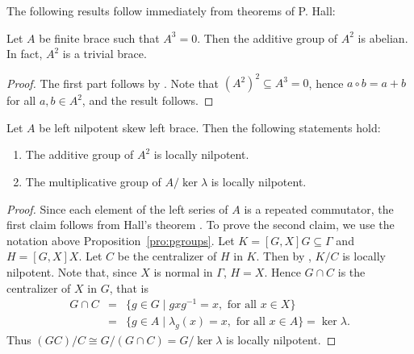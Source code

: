 The following results follow immediately from theorems of P.  Hall:

\begin{lemma}
    Let $A$ be finite brace such that $A^3=0$. Then the additive group of
    $A^2$ is abelian. In fact, $A^2$ is a trivial brace.
\end{lemma}

\begin{proof}
The first part follows by \cite[Theorem~6]{Hall}. Note that
$(A^2)^2\subseteq A^3=0$, hence $a\circ b=a+b$ for all $a,b\in A^2$, and
the result follows.
\end{proof}


\begin{theorem}
    \label{thm:A2}
    Let $A$ be left nilpotent skew left brace. Then the following statements
    hold:
    \begin{enumerate}
        \item The additive group of $A^2$ is locally nilpotent.
        \item The multiplicative group of $A/\ker\lambda$ is locally nilpotent.
    \end{enumerate}
\end{theorem}

\begin{proof}
    Since each element of the left series of $A$ is a repeated commutator, the
    first claim follows from Hall's theorem \cite[Theorem~4]{Hall}.
    To prove the second claim, we use the notation above
    Proposition~\ref{pro:pgroups}. Let $K=[G,X]G\subseteq \Gamma$ and
    $H=[G,X]X$. Let $C$ be the centralizer of $H$ in $K$. Then by
    \cite[Theorem~4]{Hall}, $K/C$ is locally nilpotent. Note
    that, since $X$ is normal in $\Gamma$, $H=X$. Hence $G\cap C$ is the
    centralizer of $X$ in $G$, that is
    \begin{eqnarray*}G\cap C&=&\{ g\in G\mid gxg^{-1}=x, \text{ for all } x\in X\}\\
    &=&\{ g\in A\mid \lambda_g(x)=x, \text{ for all } x\in A\}=\ker\lambda.
    \end{eqnarray*}
     Thus $(GC)/C\cong G/(G\cap
     C)=G/\ker\lambda$ is locally nilpotent.
\end{proof}


